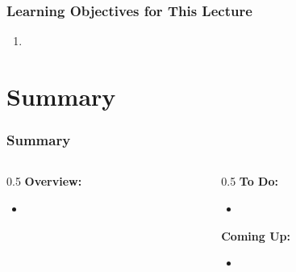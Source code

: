 \documentclass{ltx-talk}
\title{\thislecture}
\begin{document}
\maketitle

\begin{frame}
  \frametitle{Learning Objectives for This Lecture}

  \begin{enumerate}
  \item
  \end{enumerate}
  
\end{frame}

\section{Summary}

\begin{frame}
  \frametitle{Summary}

  \begin{columns}[t]
    \begin{column}{0.5\textwidth}
      \textbf{Overview:}

      \begin{itemize}
      \item 
      \end{itemize}
    \end{column}
    \begin{column}{0.5\textwidth}
      \textbf{To Do:}

      \begin{itemize}
      \item 
      \end{itemize}

      \vspace{0.5em}
      \textbf{Coming Up:}

      \begin{itemize}
      \item 
      \end{itemize}
    \end{column}
  \end{columns}
\end{frame}
\end{document}
